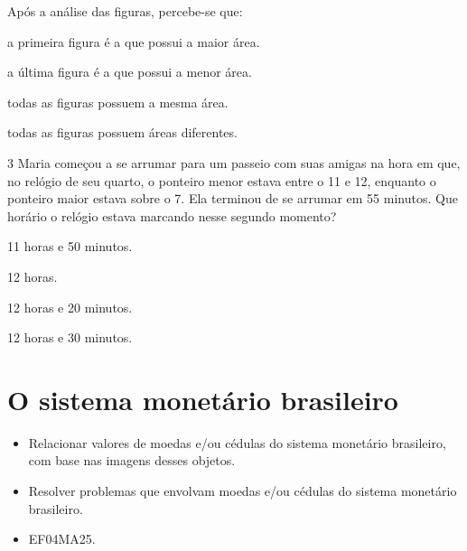 \begin{mdframed}[linewidth=2pt,linecolor=salmao,roundcorner=2pt]
Após a análise das figuras, percebe-se que:

\begin{escolha}
\item
  a primeira figura é a que possui a maior área.
\item
  a última figura é a que possui a menor área.
\item
  todas as figuras possuem a mesma área.
\item
  todas as figuras possuem áreas diferentes.
\end{escolha}

\num{3} Maria começou a se arrumar para um passeio com suas amigas na hora em
que, no relógio de seu quarto, o ponteiro menor estava entre o 11 e 12, enquanto o ponteiro maior estava sobre o 7. Ela terminou de se arrumar em 55 minutos. Que horário
o relógio estava marcando nesse segundo momento?

\begin{escolha}
\item
  11 horas e 50 minutos.
\item
  12 horas.
\item
  12 horas e 20 minutos.
\item
  12 horas e 30 minutos.
\end{escolha}


\chapter{O sistema monetário brasileiro}


\begin{itemize}
\item Relacionar valores de moedas e/ou cédulas do sistema monetário
brasileiro, com base nas imagens desses objetos.

\item Resolver problemas que envolvam moedas e/ou cédulas do sistema
monetário brasileiro.
\end{itemize}


\begin{itemize}
  \item EF04MA25.
\end{itemize}

\end{mdframed}
